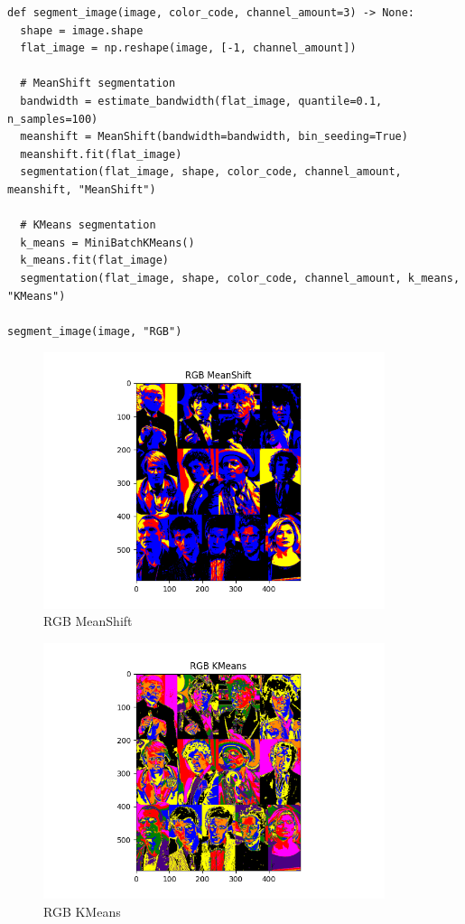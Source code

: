 \begin{verbatim}
def segment_image(image, color_code, channel_amount=3) -> None:
  shape = image.shape
  flat_image = np.reshape(image, [-1, channel_amount])

  # MeanShift segmentation
  bandwidth = estimate_bandwidth(flat_image, quantile=0.1, n_samples=100)
  meanshift = MeanShift(bandwidth=bandwidth, bin_seeding=True)
  meanshift.fit(flat_image)
  segmentation(flat_image, shape, color_code, channel_amount, meanshift, "MeanShift")

  # KMeans segmentation
  k_means = MiniBatchKMeans()
  k_means.fit(flat_image)
  segmentation(flat_image, shape, color_code, channel_amount, k_means, "KMeans")

segment_image(image, "RGB")
\end{verbatim}

\begin{figure}[H]
  \centering
  \includegraphics[width=100mm]{Figures/RGB_MeanShift}
  \caption{RGB MeanShift}
  \label{fig:rgb_meanshift}
\end{figure}

\begin{figure}[H]
  \centering
  \includegraphics[width=100mm]{Figures/RGB_KMeans}
  \caption{RGB KMeans}
  \label{fig:rgb_kmeans}
\end{figure}


